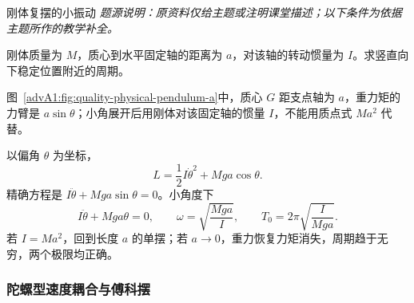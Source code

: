 \begin{advexamplebox}{刚体复摆的小振动}\label{advA1:ex:physical-pendulum}
\emph{题源说明：原资料仅给主题或注明课堂描述；以下条件为依据主题所作的教学补全。}\par
刚体质量为 $M$，质心到水平固定轴的距离为 $a$，对该轴的转动惯量为 $I$。求竖直向下稳定位置附近的周期。

\begin{qualityfigure}
\label{advA1:fig:quality-physical-pendulum-q}
\end{qualityfigure}
\end{advexamplebox}
\begin{advsolution}
\begin{qualityfigure}
\label{advA1:fig:quality-physical-pendulum-a}
\end{qualityfigure}
图~\ref{advA1:fig:quality-physical-pendulum-a}中，质心 $G$ 距支点轴为 $a$，重力矩的力臂是 $a\sin\theta$；小角展开后用刚体对该固定轴的惯量 $I$，不能用质点式 $Ma^2$ 代替。

以偏角 $\theta$ 为坐标，
\[
 L=\frac12I\dot\theta^2+Mga\cos\theta.
\]
精确方程是 $I\ddot\theta+Mga\sin\theta=0$。小角度下
\[
 I\ddot\theta+Mga\theta=0,
 \qquad \boxed{\omega=\sqrt{\frac{Mga}{I}}},
 \qquad \boxed{T_0=2\pi\sqrt{\frac I{Mga}}}.
\]
若 $I=Ma^2$，回到长度 $a$ 的单摆；若 $a\to0$，重力恢复力矩消失，周期趋于无穷，两个极限均正确。
\end{advsolution}

\subsubsection{陀螺型速度耦合与傅科摆}

